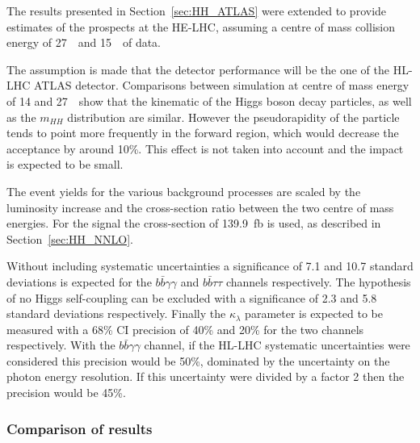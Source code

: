 \label{sec:HH_HE_atlas}
\begin{center}
\end{center}

The results presented in Section~\ref{sec:HH_ATLAS} were extended to provide estimates of the prospects at the HE-LHC, assuming a centre of mass collision energy of 27~\TeV\ and 15~\abinv\ of data.

The assumption is made that the detector performance will be the one of the HL-LHC ATLAS detector. Comparisons between simulation at centre of mass energy of 14 and 27~\TeV\ show that the kinematic of the Higgs boson decay particles, as well as the $m_{HH}$ distribution are similar. However the pseudorapidity of the particle tends to point more frequently in the forward region, which would decrease the acceptance by around 10\%. This effect is not taken into account and the impact is expected to be small.

The event yields for the various background processes are scaled by the luminosity increase and the cross-section ratio between the two centre of mass energies. For the signal the cross-section of 139.9~fb is used, as described in Section~\ref{sec:HH_NNLO}.

Without including systematic uncertainties a significance of 7.1 and 10.7 standard deviations is expected for the $b\bar{b}\gamma\gamma$ and $b\bar{b}\tau\tau$ channels respectively.
The hypothesis of no Higgs self-coupling can be excluded with a significance of 2.3 and 5.8 standard deviations respectively. Finally the $\kappa_{\lambda}$ parameter is expected to be measured with a 68\% CI precision of 40\% and 20\% for the two channels respectively.
With the $b\bar{b}\gamma\gamma$ channel, if the HL-LHC systematic uncertainties were considered this precision would be 50\%, dominated by the uncertainty on the photon energy resolution. If this uncertainty were divided by a factor 2 then the precision would be 45\%.



\subsubsection{Comparison of results}

